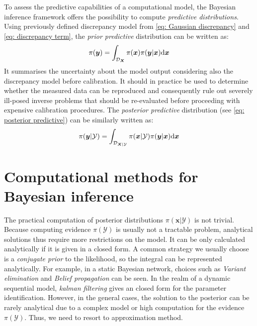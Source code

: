 To assess the predictive capabilities of a computational model, the Bayesian inference framework offers the possibility to compute \textit{predictive distributions}. Using previously defined discrepancy model from \cref{eq: Gaussian discrepancy} and \cref{eq: discrepancy term}, the \textit{prior predictive} distribution can be written as:
\begin{equation}
    \label{eq: prior predictive}
    \pi(\boldsymbol{y}) = \int_{\mathcal{D}_{\boldsymbol{X}}} 
    \pi(\boldsymbol{x}) \pi(\boldsymbol{y}|\boldsymbol{x}) {\rm{d}} \boldsymbol{x}
\end{equation}
It summarises the uncertainty about the model output considering also the discrepancy model before calibration. It should in practice be used to determine whether the measured data can be reproduced and consequently rule out severely ill-posed inverse problems that should be re-evaluated before proceeding with expensive calibration procedures. The \textit{posterior predictive} distribution (see \cref{eq: posterior predictive}) can be similarly written as:
\begin{equation}
    \label{eq: posterior predictive}
    \pi(\boldsymbol{y}|\mathcal{Y}) = \int_{\mathcal{D}_{\boldsymbol{X}|\mathcal{Y}}} 
    \pi(\boldsymbol{x}|\mathcal{Y}) \pi(\boldsymbol{y}|\boldsymbol{x}) {\rm{d}} \boldsymbol{x}
\end{equation}
\section{Computational methods for Bayesian inference}
The practical computation of posterior distributions $\pi(\boldsymbol{x}|\mathcal{Y})$ is not trivial. Because computing evidence $\pi(\mathcal{Y})$ is usually not a tractable problem, analytical solutions thus require more restrictions on the model. It can be only calculated analytically if it is given in a closed form. A common strategy we usually choose is a \textit{conjugate prior} \citep{gelman1995} to the likelihood, so the integral can be represented analytically. For example, in a static Bayesian network, choices such as \textit{Variant elimination} and \textit{Belief propagation} \citep{murphy2012} can be seen. In the realm of a dynamic sequential model, \textit{kalman filtering} \citep{nguyen2016} gives an closed form for the parameter identification. However, in the general cases, the solution to the posterior can be rarely analytical due to a complex model or high computation for the evidence $\pi(\mathcal{Y})$. Thus, we need to resort to approximation method.

